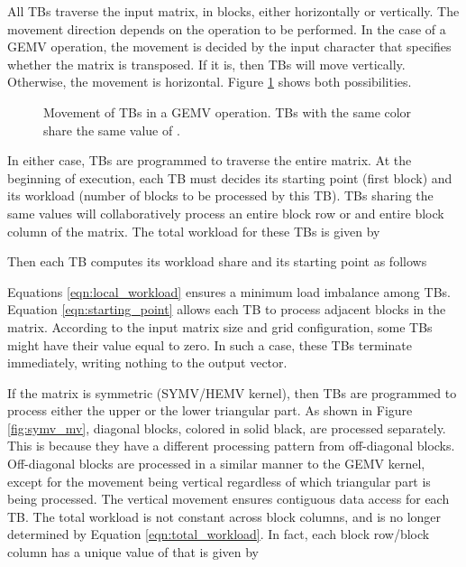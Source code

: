 All TBs traverse the input matrix, in blocks, either horizontally or vertically. The movement direction depends 
on the operation to be performed. In the case of a GEMV operation, the movement is decided by the 
input character that specifies whether the matrix is transposed. If it is, then TBs will move vertically. 
Otherwise, the movement is horizontal. Figure \ref{fig:gemv_mv} shows both possibilities. 
\begin{figure}[ht]
\centering
{}
\caption[]{Movement of TBs in a GEMV operation. TBs with the same color share the same value of .}
\label{fig:gemv_mv}
\end{figure}
In either case, TBs are programmed to traverse the entire matrix. At the beginning of execution, 
each TB must decides its starting point (first block) and its workload (number of blocks to be 
processed by this TB). TBs sharing the same  values will collaboratively process an entire block row or and 
entire block column of the matrix. The total workload  for these TBs is given by

Then each TB computes its workload share  and its starting point  as follows


Equations \ref{eqn:local_workload} ensures a minimum load imbalance among TBs. Equation \ref{eqn:starting_point} allows 
each TB to process adjacent blocks in the matrix. According to the input matrix size and grid configuration, some TBs 
might have their  value equal to zero. In such a case, these TBs terminate immediately, writing nothing to the output 
vector.

If the matrix is symmetric (SYMV/HEMV kernel), then TBs are programmed to process either the upper or the lower triangular part. As shown in 
Figure \ref{fig:symv_mv}, diagonal blocks, colored in solid black, are processed separately. This is because they have a different 
processing pattern from off-diagonal blocks.
Off-diagonal blocks are processed in a 
similar manner to the GEMV kernel, except for the movement being vertical regardless of which triangular part is being processed. 
The vertical movement ensures contiguous data access for each TB. 
The total workload  is not constant across block columns, and is no longer determined by Equation \ref{eqn:total_workload}. In fact, each block row/block column has a unique 
value of  that is given by 


